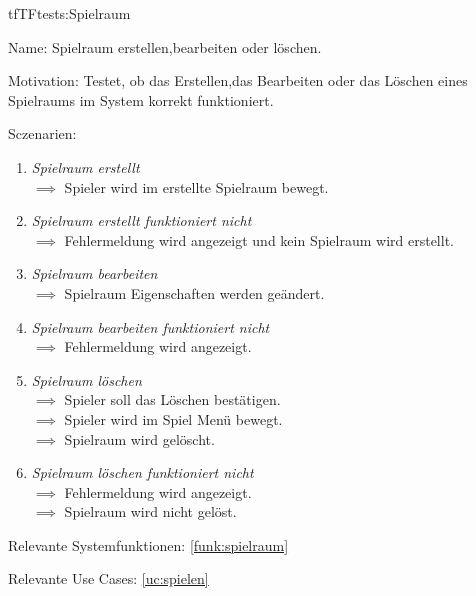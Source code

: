 \begin{description}[leftmargin=5em, style=sameline]

\begin{lhp}{tf}{TF}{tests:Spielraum}
	\item [Name:] Spielraum erstellen,bearbeiten oder löschen.
	\item [Motivation:] Testet, ob das Erstellen,das Bearbeiten oder das Löschen eines Spielraums im System korrekt funktioniert.
	\item [Sczenarien:] \hfill
		\begin{enumerate}
			\item \textit{Spielraum erstellt} \\ $\implies$ Spieler wird im erstellte Spielraum bewegt.
			\item \textit{Spielraum erstellt funktioniert nicht} \\ $\implies$ Fehlermeldung wird angezeigt und kein Spielraum wird erstellt.
			\item \textit{Spielraum bearbeiten} \\ $\implies$ Spielraum Eigenschaften werden geändert.
			\item \textit{Spielraum bearbeiten funktioniert nicht} \\ $\implies$ Fehlermeldung wird angezeigt.
			\item \textit{Spielraum löschen} \\ $\implies$ Spieler soll das Löschen bestätigen.
							         \\ $\implies$ Spieler wird im Spiel Menü bewegt.
\\ $\implies$ Spielraum wird gelöscht.
			\item \textit{Spielraum löschen funktioniert nicht} \\ $\implies$ Fehlermeldung wird angezeigt.
\\ $\implies$ Spielraum wird nicht gelöst.
		\end{enumerate}
	\item [Relevante Systemfunktionen:] \ref{funk:spielraum}
	\item [Relevante Use Cases:] \ref{uc:spielen}
\end{lhp}

\end{description}

